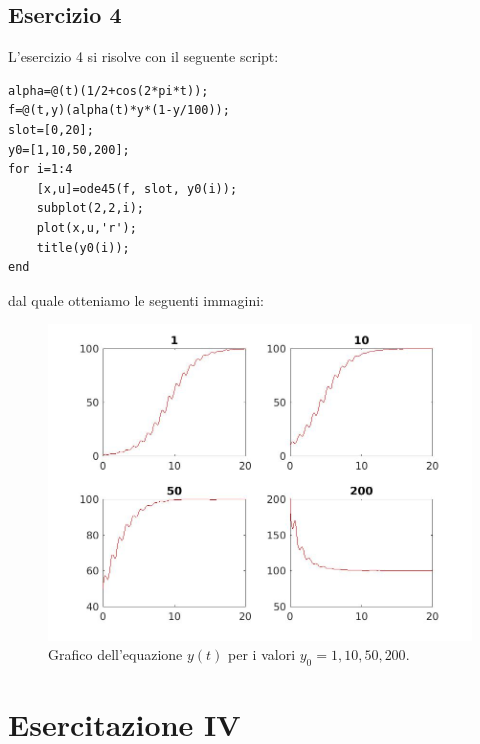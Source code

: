 \documentclass[11pt,a4paper,twoside,openright,titlepage,
headinclude,footinclude,BCOR5mm,
numbers=noenddot,cleardoublepage=empty,
tablecaptionabove]{scrbook}
\begin{document}
\subsection{Esercizio 4}
L'esercizio 4 si risolve con il seguente script:
\begin{lstlisting}[frame=trBL]
alpha=@(t)(1/2+cos(2*pi*t));
f=@(t,y)(alpha(t)*y*(1-y/100));
slot=[0,20];
y0=[1,10,50,200];
for i=1:4
    [x,u]=ode45(f, slot, y0(i));
    subplot(2,2,i);
    plot(x,u,'r');
    title(y0(i));
end
\end{lstlisting}
dal quale otteniamo le seguenti immagini:
\begin{center}
\begin{figure}[h!]
\includegraphics[width=\textwidth]{figs/ese4_s.jpg}
\caption{Grafico dell'equazione $y(t)$ per i valori $y_{0}=1,10,50,200$.}
\end{figure}
\end{center}

\newpage
\section{Esercitazione IV}
\end{document}
